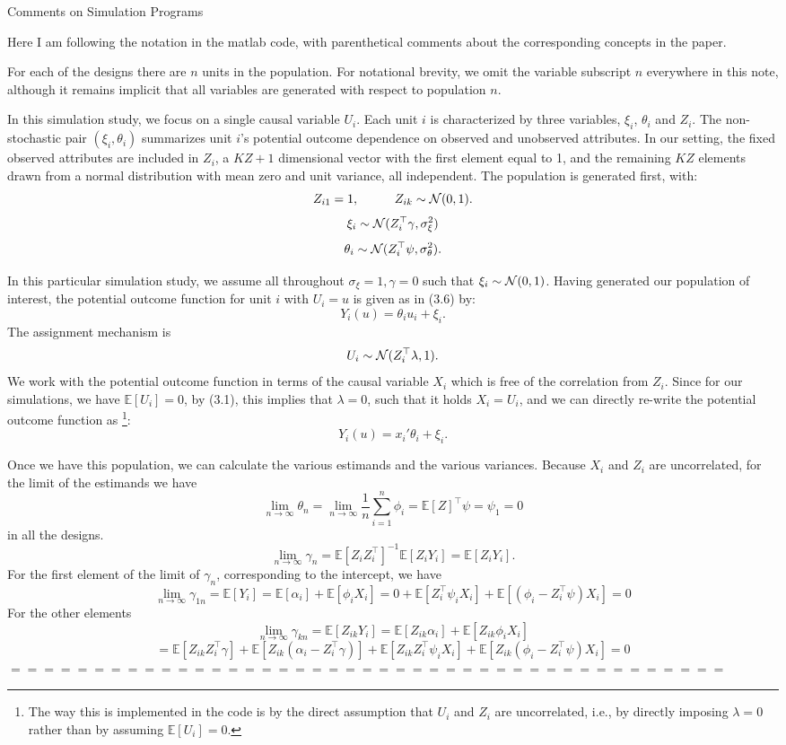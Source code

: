 \documentclass[11pt,fleqn]{article}
\begin{document}
\centerline{Comments on Simulation Programs}

Here I am following the notation in the matlab code, with parenthetical comments about the corresponding concepts in the paper. 


For each of the designs there are $n$ units in the population. For notational brevity, we omit the variable subscript $n$ everywhere in this note, although it remains implicit that all variables are generated with respect to population $n$. 

In this simulation study, we focus on a single causal variable $U_i$. Each unit $i$ is characterized by three variables, $\xi_i$, $\theta_i$ and $Z_i$.  The non-stochastic pair $(\xi_i, \theta_i)$ summarizes unit $i$'s potential outcome dependence on observed and unobserved attributes. In our setting, the fixed observed attributes are included in $Z_i$, a $KZ+1$ dimensional vector with the first element equal to 1, and the remaining $KZ$ elements drawn from a normal distribution with mean zero and unit variance, all independent.
The population is generated first, with:
\[ Z_{i1}=1,\hskip1cm Z_{ik}\sim{\cal N}(0,1).\]
\[ \xi_i\sim {\cal N}(Z_i^\top \gamma,\sigma_\xi^2)\]
\[ \theta_i\sim {\cal N}(Z_i^\top \psi,\sigma_\theta^2).\]

In this particular simulation study, we assume all throughout $\sigma_\xi = 1, \gamma = 0$ such that $\xi_i\sim {\cal N}(0,1)$. Having generated our population of interest, the potential outcome function for unit $i$ with $U_i = u$ is given as in (3.6) by:
\[ Y_i(u)= \theta_i u_i + \xi_i. \] 
The assignment mechanism is
\[ U_i\sim {\cal N}(Z_i^\top\lambda,1).\]
We work with the potential outcome function in terms of the causal variable $X_i$ which is free of the correlation from $Z_i$. Since for our simulations, we have $\mathbb{E}[U_i] = 0$, by (3.1), this implies that $\lambda = 0$, such that it holds $X_i = U_i$, and we can directly re-write the potential outcome function as \footnote{The way this is implemented in the code is by the direct assumption that $U_i$ and $Z_i$ are uncorrelated, i.e., by directly imposing $\lambda = 0$ rather than by assuming $\mathbb{E}[U_i] = 0$.}:
\[ Y_i(u)= x_i' \theta_i + \xi_i. \] 


Once we have this population, we can calculate the various estimands and the various variances.
Because $X_i$ and $Z_i$ are uncorrelated, for the limit of the estimands we have
\[ \lim_{n\rightarrow\infty} \theta_n=\lim_{n\rightarrow\infty}
\frac{1}{n}\sum_{i=1}^n \phi_i=\mathbb{E}[Z]^\top \psi=\psi_1=0\]
in all the designs.
\[\lim_{n\rightarrow\infty} \gamma_n=\mathbb{E}[Z_iZ^\top_i]^{-1}\mathbb{E}[Z_iY_i]=\mathbb{E}[Z_iY_i].\]
For the first element of the limit of $\gamma_n$, corresponding to the intercept, we have
\[ \lim_{n\rightarrow\infty}\gamma_{1n}=\mathbb{E}[Y_i]=
\mathbb{E}[\alpha_i]+\mathbb{E}[\phi_iX_i]
=0+\mathbb{E}[Z_i^\top \psi_iX_i]+\mathbb{E}[(\phi_i-Z_i^\top \psi)X_i]=0\]
For the other elements
\[ \lim_{n\rightarrow\infty}\gamma_{kn}=\mathbb{E}[Z_{ik}Y_i]=
\mathbb{E}[Z_{ik}\alpha_i]+\mathbb{E}[Z_{ik}\phi_iX_i]\]
\[
=\mathbb{E}[Z_{ik}Z_i^\top\gamma]+\mathbb{E}[Z_{ik}(\alpha_i-Z_i^\top\gamma)]+\mathbb{E}[Z_{ik}Z_i^\top \psi_iX_i]+\mathbb{E}[Z_{ik}(\phi_i-Z_i^\top \psi)X_i]=0\]
$===========================================$
\end{document}
